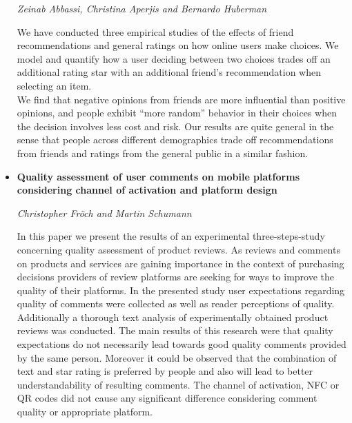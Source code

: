 \begin{itemize}
\textit{Zeinab Abbassi, Christina Aperjis and Bernardo Huberman}

We have conducted three empirical studies of the effects of friend
recommendations and general ratings on how online users make choices.
We model and quantify how a user deciding between two choices trades off an
additional rating star with an additional friend's recommendation when selecting
an item.\\
We find that negative opinions from friends are more influential than positive
opinions, and people exhibit ``more random'' behavior in their choices when the
decision involves less cost and risk. Our results are quite general in the sense
that people across different demographics trade off recommendations from friends
and ratings from the general public in a similar fashion. 

\item \textbf{Quality assessment of user comments on mobile platforms
considering channel of activation and platform design}

\textit{Christopher Fröch and Martin Schumann}

In this paper we present the results of an experimental three-steps-study
concerning quality assessment of product reviews. As reviews and comments on
products and services are gaining importance in the context of purchasing
decisions providers of review platforms are seeking for ways to improve the
quality of their platforms. In the presented study user expectations regarding
quality of comments were collected as well as reader perceptions of quality.
Additionally a thorough text analysis of experimentally obtained product reviews
was conducted. The main results of this research were that quality expectations
do not necessarily lead towards good quality comments provided by the same
person. Moreover it could be observed that the combination of text and star
rating is preferred by people and also will lead to better understandability of
resulting comments. The channel of activation, NFC or QR codes did not cause any
significant difference considering comment quality or appropriate platform.

\end{itemize}

